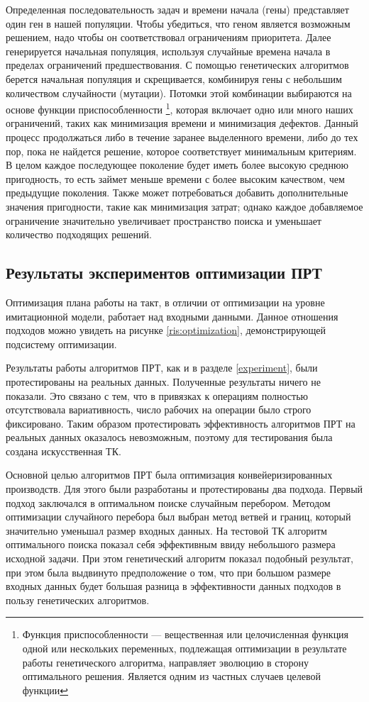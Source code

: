 Определенная последовательность задач и времени начала (гены) представляет один ген в нашей популяции. Чтобы убедиться, что геном является возможным решением, надо чтобы он соответствовал ограничениям приоритета. Далее генерируется начальная популяция, используя случайные времена начала в пределах ограничений предшествования. С помощью генетических алгоритмов берется начальная популяция и скрещивается, комбинируя гены с небольшим количеством случайности (мутации). Потомки этой комбинации выбираются на основе функции приспособленности \footnote{Функция приспособленности — вещественная или целочисленная функция одной или нескольких переменных, подлежащая оптимизации в результате работы генетического алгоритма, направляет эволюцию в сторону оптимального решения. Является одним из частных случаев целевой функции}, которая включает одно или много наших ограничений, таких как минимизация времени и минимизация дефектов. Данный процесс продолжаться либо в течение заранее выделенного времени, либо до тех пор, пока не найдется решение, которое соответствует минимальным критериям. В целом каждое последующее поколение будет иметь более высокую среднюю пригодность, то есть займет меньше времени с более высоким качеством, чем предыдущие поколения. Также может потребоваться добавить дополнительные значения пригодности, такие как минимизация затрат; однако каждое добавляемое ограничение значительно увеличивает пространство поиска и уменьшает количество подходящих решений.

\subsection{Результаты экспериментов оптимизации ПРТ}
Оптимизация плана работы на такт, в отличии от оптимизации на уровне имитационной модели, работает над входными данными. Данное отношения подходов можно увидеть на рисунке \ref{ris:optimization}, демонстрирующей подсистему оптимизации. 

Результаты работы алгоритмов ПРТ, как и в разделе \ref{experiment}, были протестированы на реальных данных. 
Полученные результаты ничего не показали. Это связано с тем, что в привязках к операциям полностью отсутствовала вариативность, число рабочих на операции было строго фиксировано. Таким образом протестировать эффективность алгоритмов ПРТ на реальных данных оказалось невозможным, поэтому для тестирования была создана искусственная ТК.

Основной целью алгоритмов ПРТ была оптимизация конвейеризированных производств. Для этого были разработаны и протестированы два подхода. 
Первый подход заключался в оптимальном поиске случайным перебором. Методом оптимизации случайного перебора был выбран метод ветвей и границ, который значительно уменьшал размер входных данных.
На тестовой ТК алгоритм оптимального поиска показал себя эффективным ввиду небольшого размера исходной задачи.
При этом генетический алгоритм показал подобный результат, при этом была выдвинуто предположение о том, что при большом размере входных данных будет большая разница в эффективности данных подходов в пользу генетических алгоритмов.

